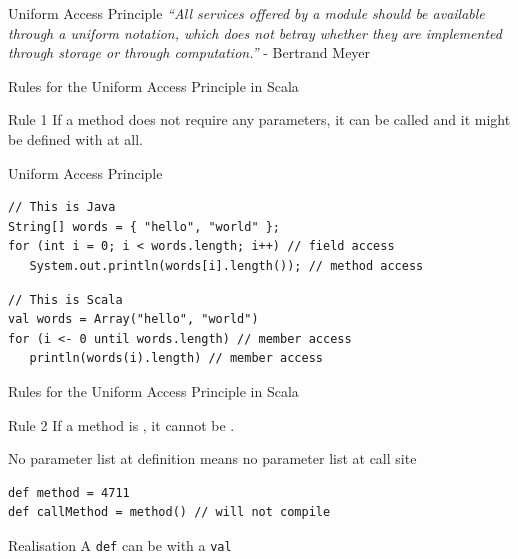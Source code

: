 \begin{frame}[fragile]{Uniform Access Principle}
\pause
\emph{``All services offered by a module should be available through a uniform
notation, which does not betray whether they are implemented through storage or
through computation.''} - Bertrand Meyer
\end{frame}

\begin{frame}[fragile]{Rules for the Uniform Access Principle in Scala}
\begin{block}{Rule 1}
If a method does not require any parameters, it can be called  and it might be defined with  at
all.
\end{block}
\pause
\begin{exampleblock}{Uniform Access Principle}
\begin{lstlisting}
// This is Java
String[] words = { "hello", "world" };
for (int i = 0; i < words.length; i++) // field access
   System.out.println(words[i].length()); // method access
\end{lstlisting}
\pause
\begin{lstlisting}
// This is Scala
val words = Array("hello", "world")
for (i <- 0 until words.length) // member access
   println(words(i).length) // member access
\end{lstlisting}
\end{exampleblock}
\end{frame}

\begin{frame}[fragile]{Rules for the Uniform Access Principle in Scala}
\begin{block}{Rule 2}
If a method is , it \alert{cannot}
be .
\end{block}
\pause
\begin{alertblock}{No parameter list at definition means no parameter list at
call site}
\begin{lstlisting}
def method = 4711
def callMethod = method() // will not compile
\end{lstlisting}
\end{alertblock}
\pause
\begin{block}{Realisation}
A \lstinline!def! can be  with a \lstinline!val!
\end{block}
\end{frame}

